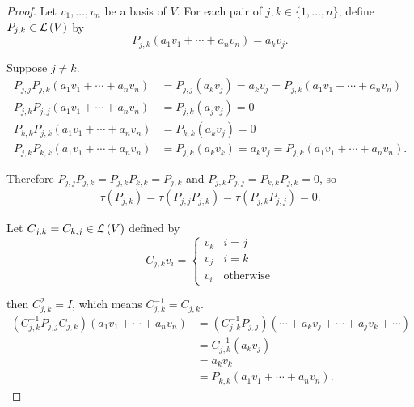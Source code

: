 \begin{proof}
    Let $v_{1}, \ldots, v_{n}$ be a basis of $V$. For each pair of $j,k\in\{1,\ldots,n\}$, define $P_{j,k}\in\mathcal{L}\left({V}\right)$ by
    \[
        P_{j,k}(a_{1}v_{1} + \cdots + a_{n}v_{n}) = a_{k}v_{j}.
    \]

    Suppose $j\ne k$.
    \begin{align*}
        P_{j,j}P_{j,k}(a_{1}v_{1} + \cdots + a_{n}v_{n}) & = P_{j,j}(a_{k}v_{j}) = a_{k}v_{j} = P_{j,k}(a_{1}v_{1} + \cdots + a_{n}v_{n})  \\
        P_{j,k}P_{j,j}(a_{1}v_{1} + \cdots + a_{n}v_{n}) & = P_{j,k}(a_{j}v_{j}) = 0                                                       \\
        P_{k,k}P_{j,k}(a_{1}v_{1} + \cdots + a_{n}v_{n}) & = P_{k,k}(a_{k}v_{j}) = 0                                                       \\
        P_{j,k}P_{k,k}(a_{1}v_{1} + \cdots + a_{n}v_{n}) & = P_{j,k}(a_{k}v_{k}) = a_{k}v_{j} = P_{j,k}(a_{1}v_{1} + \cdots + a_{n}v_{n}).
    \end{align*}

    Therefore $P_{j,j}P_{j,k} = P_{j,k}P_{k,k} = P_{j,k}$ and $P_{j,k}P_{j,j} = P_{k,k}P_{j,k} = 0$, so
    \begin{align*}
        \tau(P_{j,k}) = \tau(P_{j,j}P_{j,k}) = \tau(P_{j,k}P_{j,j}) = 0.
    \end{align*}

    Let $C_{j,k} = C_{k,j}\in\mathcal{L}\left({V}\right)$ defined by
    \[
        C_{j,k}v_{i} = \begin{cases}
            v_{k} & i = j            \\
            v_{j} & i = k            \\
            v_{i} & \text{otherwise}
        \end{cases}
    \]

    then $C_{j,k}^{2} = I$, which means $C_{j,k}^{-1} = C_{j,k}$.
    \begin{align*}
        (C_{j,k}^{-1}P_{j,j}C_{j,k})(a_{1}v_{1} + \cdots + a_{n}v_{n}) & = (C_{j,k}^{-1}P_{j,j})(\cdots + a_{k}v_{j} + \cdots + a_{j}v_{k} + \cdots) \\
                                                                       & = C_{j,k}^{-1}(a_{k}v_{j})                                                  \\
                                                                       & = a_{k}v_{k}                                                                \\
                                                                       & = P_{k,k}(a_{1}v_{1} + \cdots + a_{n}v_{n}).
    \end{align*}


\end{proof}
